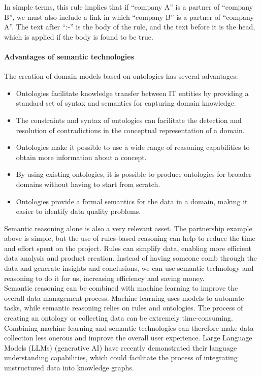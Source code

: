             In simple terms, this rule implies that if “company A” is a partner of “company B”, we must also include a link in which “company B” is a partner of “company A”. The text after “:-” is the body of the rule, and the text before it is the head, which is applied if the body is found to be true.


            \paragraph{Advantages of semantic technologies}
            The creation of domain models based on ontologies has several advantages: 
        
            \begin{itemize}
                \item Ontologies facilitate knowledge transfer between IT entities by providing a standard set of syntax and semantics for capturing domain knowledge. 
                \item The constraints and syntax of ontologies can facilitate the detection and resolution of contradictions in the conceptual representation of a domain. 
                \item Ontologies make it possible to use a wide range of reasoning capabilities to obtain more information about a concept. 
                \item By using existing ontologies, it is possible to produce ontologies for broader domains without having to start from scratch. 
                \item Ontologies provide a formal semantics for the data in a domain, making it easier to identify data quality problems.
            \end{itemize}
        
            Semantic reasoning alone is also a very relevant asset. The partnership example above is simple, but the use of rules-based reasoning can help to reduce the time and effort spent on the project. Rules can simplify data, enabling more efficient data analysis and product creation. Instead of having someone comb through the data and generate insights and conclusions, we can use semantic technology and reasoning to do it for us, increasing efficiency and saving money.\\
        
            Semantic reasoning can be combined with machine learning to improve the overall data management process. Machine learning uses models to automate tasks, while semantic reasoning relies on rules and ontologies. The process of creating an ontology or collecting data can be extremely time-consuming. Combining machine learning and semantic technologies can therefore make data collection less onerous and improve the overall user experience. Large Language Models (LLMs) (generative AI) have recently demonstrated their language understanding capabilities, which could facilitate the process of integrating unstructured data into knowledge graphs.\\
        
